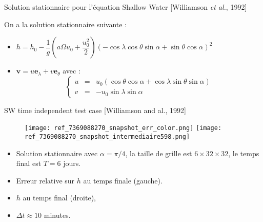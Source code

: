 \documentclass[11pt]{beamer}
\begin{document}

\begin{frame}{Solution stationnaire pour l'équation Shallow Water [Williamson \textit{et al.}, 1992]}

On a la solution stationnaire suivante :
\begin{exampleblock}{}
\begin{itemize}
\item $h = h_0 - \dfrac{1}{g} \left( a \Omega u_0 + \dfrac{u_0^2}{2} \right)\left( - \cos \lambda \cos \theta \sin \alpha + \sin \theta \cos \alpha \right)^2$
\item $\mathbf{v} = u \mathbf{e}_{\lambda}+ v \mathbf{e}_{\theta}$ avec :
\begin{equation*}
\left\lbrace \begin{array}{rcl}
 u & = & u_0 ( \cos \theta \cos \alpha + \cos \lambda \sin \theta \sin \alpha)\\
 v & = & -u_0 \sin \lambda \sin \alpha
 \end{array} \right.
\end{equation*}
\end{itemize}
\end{exampleblock}
\end{frame}


\begin{frame}{SW time independent test case [Williamson and al., 1992]}
\begin{figure}
\texttt{[image: ref\_7369088270\_snapshot\_err\_color.png]}
\texttt{[image: ref\_7369088270\_snapshot\_intermediaire598.png]}
\end{figure}
\begin{itemize}
\item Solution stationnaire avec $\alpha=\pi/4$, la taille de grille est $6 \times 32 \times 32$, le temps final est $T=6$ jours.
\item Erreur relative sur $h$ au temps finale (gauche).
\item $h$ au temps final (droite),
\item $\Delta t \approx 10$ minutes.
\end{itemize}
\end{frame}
\end{document}
